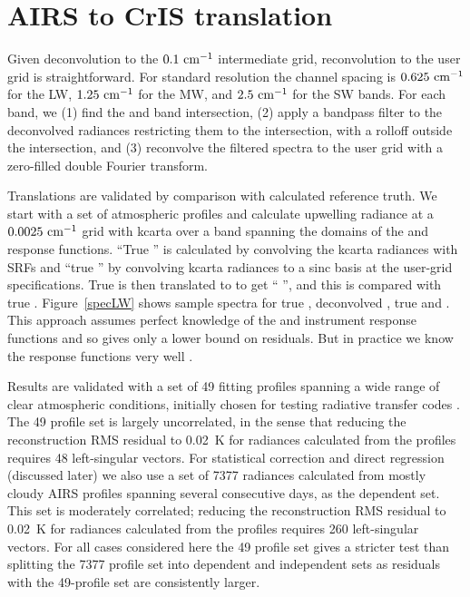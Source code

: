 \documentclass[11pt]{article}
\begin{document}
\FloatBarrier
\section{AIRS to CrIS translation}
\label{airs2cris}

Given deconvolution to the $0.1~\mbox{cm$^{-1}$}$ intermediate grid,
reconvolution to the {\cris} user grid is straightforward.  For
{\cris} standard resolution the channel spacing is $0.625~\mbox{cm$^{-1}$}$ for
the LW, $1.25~\mbox{cm$^{-1}$}$ for the MW, and $2.5~\mbox{cm$^{-1}$}$ for the SW bands.  For
each {\cris} band, we (1) find the {\airs} and {\cris} band
intersection, (2) apply a bandpass filter to the deconvolved {\airs}
radiances restricting them to the intersection, with a rolloff
outside the intersection, and (3) reconvolve the filtered spectra to
the {\cris} user grid with a zero-filled double Fourier transform.

Translations are validated by comparison with calculated reference
truth.  We start with a set of atmospheric profiles and calculate
upwelling radiance at a $0.0025~\mbox{cm$^{-1}$}$ grid with kcarta \cite{kcarta1}
over a band spanning the domains of the {\airs} and {\cris} response
functions.  ``True {\airs}'' is calculated by convolving the kcarta
radiances with {\airs} SRFs and ``true {\cris}'' by convolving
kcarta radiances to a sinc basis at the {\cris} user-grid
specifications.  True {\airs} is then translated to {\cris} to get
``{\airs} {\cris}'', and this is compared with true {\cris}.
Figure~\ref{specLW} shows sample spectra for true {\airs},
deconvolved {\airs}, true {\cris} and {\airs} {\cris}.  This
approach assumes perfect knowledge of the {\airs} and {\cris}
instrument response functions and so gives only a lower bound on
residuals.  But in practice we know the response functions very well
\cite{crisval1,airsval1}.

Results are validated with a set of 49 fitting profiles spanning a
wide range of clear atmospheric conditions, initially chosen for
testing radiative transfer codes \cite{sarta1,sarta2}.  The 49
profile set is largely uncorrelated, in the sense that reducing the
reconstruction RMS residual to 0.02~K for radiances calculated from
the profiles requires 48 left-singular vectors.  For statistical
correction and direct regression (discussed later) we also use a set
of 7377 radiances calculated from mostly cloudy AIRS profiles
spanning several consecutive days, as the dependent set.  This set
is moderately correlated; reducing the reconstruction RMS residual
to 0.02~K for radiances calculated from the profiles requires 260
left-singular vectors.  For all cases considered here the 49 profile
set gives a stricter test than splitting the 7377 profile set into
dependent and independent sets as residuals with the 49-profile
set are consistently larger.
\end{document}
